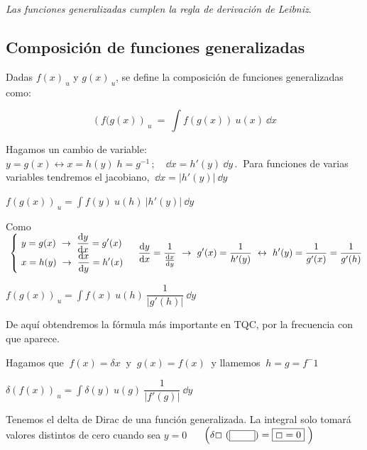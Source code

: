\emph{Las funciones generalizadas cumplen la regla de derivación de Leibniz}.

\vspace{0.5cm}
\subsection{Composición de  funciones generalizadas}
\vspace{0.5cm}



\begin{definition}

Dadas $f(x)_{\ u}$ y $g(x)_{\ u}$, se define la composición de funciones generalizadas como:

$$\left ( f(g(x) \right)_{\ u} \ = \ \displaystyle \int f(g(x))\ u(x)\ \dd x$$	
\end{definition}

Hagamos un cambio de variable: $y=g(x) \leftrightarrow x=h(y)\; h=g^{-1}\, ; \quad \dd x=h'(y)\ \dd y\, . \ $ Para funciones de varias variables tendremos el jacobiano, $\ \dd x = |h'(y)| \ \dd y$

$f(g(x))_{\ u} = \displaystyle \int f(y)\ u(h)\ |h'(y)| \ \dd y $

Como $\ \begin{cases} \ y=g(x) \ \to \ \displaystyle \dv{y}{x}=g'(x) \\ \ x=h(y) \ \to \ \displaystyle \dv{x}{y}=h'(x) \end{cases} \ \displaystyle \dv{y}{x}=\dfrac 1{\dv{x}{y}} \ \to \ g'(x) =\dfrac 1{h'(y)} \ \leftrightarrow \ h'(y)=\dfrac 1{g'(x)}=\dfrac 1{g'(h)} $

$f(g(x))_{\ u} = \displaystyle \int f(x)\ u(h)\ \dfrac 1{|g'(h)|}\ \dd y$

De aquí obtendremos la fórmula más importante en TQC, por la frecuencia con que aparece.

\vspace{5mm} Hagamos que $\ f(x)=\delta x \ \text{ y } \ g(x)=f(x) \ $ y llamemos $\ h=g=f^-1$

$\delta (f(x))_{\ u} = \displaystyle \int \delta (y)\ u(g)\ \dfrac 1 {|f'(g)|}\ \dd y$

Tenemos el delta de Dirac de una función generalizada. La integral solo tomará valores distintos de cero cuando sea $y=0\quad $ \textcolor{gris}{$\ \left( \displaystyle \delta \Box \ ( \boxed{ \text{\textcolor{white}{xxx} }} ) = \boxed{ \Box=0} \ \right)$} 


